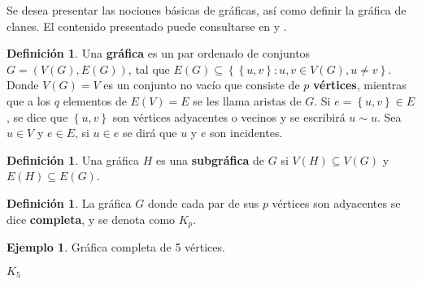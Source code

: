 \documentclass[12pt]{book}
\theoremstyle{definition}
\newtheorem{definition}[theorem]{Definición}
\newtheorem{example}[theorem]{Ejemplo}
\newcounter{in}
\newcounter{ini}
\begin{document}
Se desea presentar las nociones básicas de gráficas, así como definir
la gráfica de clanes. El contenido presentado puede consultarse en
\cite{harary} y \cite{larrion2008equivariant}.

\begin{definition}
Una \textbf{gráfica} es un par ordenado de conjuntos
$G = (V(G), E(G))$, tal que
$E(G) \subseteq \left\{ \left\{ u,v \right\} \colon u,v \in V(G), u
  \neq v \right\}$. Donde $V(G) = V$ es un conjunto no vacío que
consiste de $p$ \textbf{vértices}, mientras que a los $q$ elementos de
$E(V) = E$ se les llama aristas de $G$. Si
$e = \left\{ u,v \right\} \in E$, se dice que $\left\{ u,v \right\}$
son vértices adyacentes o vecinos y se escribirá $u \sim u$.  Sea
$u \in V$ y $e \in E$, si $u \in e$ se dirá que $u$ y $e$ son
incidentes.
\end{definition}
\begin{definition}
  \label{sub_graph}
  Una gráfica $H$ es una \textbf{subgráfica} de $G$ si
  $V(H) \subseteq V(G)$ y $E(H) \subseteq E(G)$.
\end{definition}

\begin{definition}
  \label{complete_graph}
  La gráfica $G$ donde cada par de sus $p$ vértices son adyacentes se
  dice \textbf{completa}, y se denota como $K_{p}$.
\end{definition}
\begin{example}
  Gráfica completa de 5 vértices.
  \bigskip

  \begin{minipage}{1.0\linewidth}
    \centering
  
    $K_{5}$
  \end{minipage}
  \label{fig:K5}
\end{example}
\end{document}
